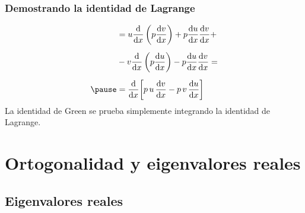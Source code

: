 \documentclass[12pt]{beamer}
\begin{document}
\begin{frame}
\frametitle{Demostrando la identidad de Lagrange}
\begin{eqnarray}
\begin{aligned}[b]
&= u \dv{x} \left( p \dv{v}{x} \right) + p \dv{u}{x} \dv{v}{x} + \\[0.5em]
&- v \dv{x} \left( p \dv{u}{x} \right) - p \dv{u}{x} \dv{v}{x} = \\[0.5em] \pause
&= \dv{x} \bigg[ p \, u \, \dv{v}{x} - p \, v \, \dv{u}{x}  \bigg]
\end{aligned}
\label{eq:ecuacion_04_21}
\end{eqnarray}
La identidad de Green se prueba simplemente integrando la identidad de Lagrange.
\end{frame}    

\section{Ortogonalidad y eigenvalores reales}
\subsection{Eigenvalores reales}
\end{document}
